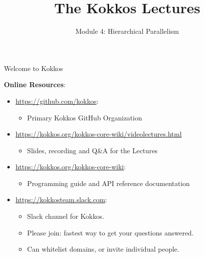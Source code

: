 
\def\sandid{SAND2020-7475 PE}

\title{The Kokkos Lectures}

\author{Module 4: Hierarchical Parallelism}




\shortfalse
\mediumtrue
\fulltrue
\notoverviewtrue



% 

\begin{frame}
	\titlepage
\end{frame}

\begin{frame}[fragile]{Welcome to Kokkos}

\textbf{Online Resources}:

\begin{itemize}
        \item \url{https://github.com/kokkos}:
                \begin{itemize}
                        \item Primary Kokkos GitHub Organization
                \end{itemize}
        \item \url{https://kokkos.org/kokkos-core-wiki/videolectures.html}
                \begin{itemize}
			\item{Slides, recording and Q\&A for the Lectures}
                \end{itemize}
        \item \url{https://kokkos.org/kokkos-core-wiki}:
                \begin{itemize}
                        \item Programming guide and API reference documentation
                \end{itemize}
        \item \url{https://kokkosteam.slack.com}:
                \begin{itemize}
                        \item Slack channel for Kokkos.
                        \item Please join: fastest way to get your questions answered.
                        \item Can whitelist domains, or invite individual people.
                \end{itemize}
\end{itemize}

\end{frame}



